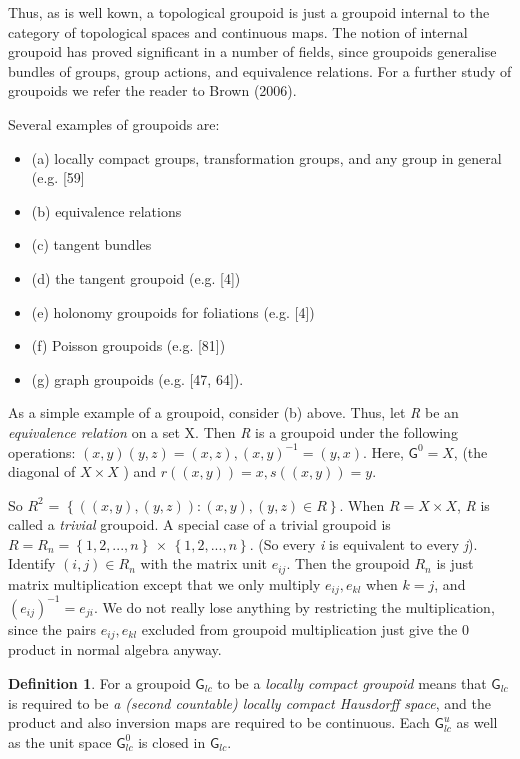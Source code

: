 \documentclass[12pt]{article}
\theoremstyle{plain}
\theoremstyle{definition}
\newtheorem{definition}{Definition}[section]
\numberwithin{equation}{section}
\newcommand{\grp}{{\mathsf{G}}}
\newcommand{\<}{{\langle}}
\begin{document}
  Thus, as is well kown, a topological groupoid is just a groupoid internal to the category of topological spaces and continuous maps. The notion of internal groupoid has proved significant in a number of fields, since groupoids generalise bundles of groups, group actions, and equivalence relations. For a further study of groupoids we refer the reader to Brown (2006).


 Several examples of groupoids are:
\begin{itemize}
\item (a) locally compact groups, transformation groups, and any group in general (e.g. [59]
\item (b) equivalence relations
\item (c) tangent bundles
\item (d) the tangent groupoid (e.g. [4])
\item (e) holonomy groupoids for foliations (e.g. [4])
\item (f) Poisson groupoids (e.g. [81])
\item (g) graph groupoids (e.g. [47, 64]).
\end{itemize}

 As a simple example of a groupoid, consider (b) above. Thus, let \textit{R} be an \textit{equivalence relation} on a set X. Then \textit{R} is a groupoid under the following operations:
$(x, y)(y, z) = (x, z), (x, y)^{-1} = (y, x)$. Here, $\grp^0 = X $, (the diagonal of $X \times X$ ) and $r((x, y)) = x,  s((x, y)) = y$.

 So $ R^2$ = $\left\{((x, y), (y, z)) : (x, y), (y, z) \in R \right\} $.
When $R = X \times X $,  \textit{R} is called a \textit{trivial} groupoid. A special case of a trivial groupoid is
$R = R_n = \left\{ 1, 2, . . . , n \right\}$  $\times $ $\left\{ 1, 2, . . . , n \right\} $. (So every \textit{i} is equivalent to every \textit{j}). Identify $(i,j) \in R_n$ with the matrix unit $e_{ij}$. Then the groupoid $R_n$ is just matrix multiplication except that we only multiply $e_{ij}, e_{kl}$ when $k = j$, and $(e_{ij} )^{-1} = e_{ji}$. We do not really lose anything by restricting the multiplication, since the pairs $e_{ij}, {e_{kl}}$ excluded from groupoid multiplication just give the 0 product in normal algebra anyway.

\begin{definition}
 For a groupoid $\grp_{lc}$ to be a \emph{locally compact groupoid} means that $\grp_{lc}$ is required to be \emph{a (second countable) locally compact Hausdorff space}, and the product and also inversion maps are required to be continuous. Each $\grp_{lc}^u$ as well as the unit space $\grp_{lc}^0$ is closed in $\grp_{lc}$. 
\end{definition}
\end{document}
